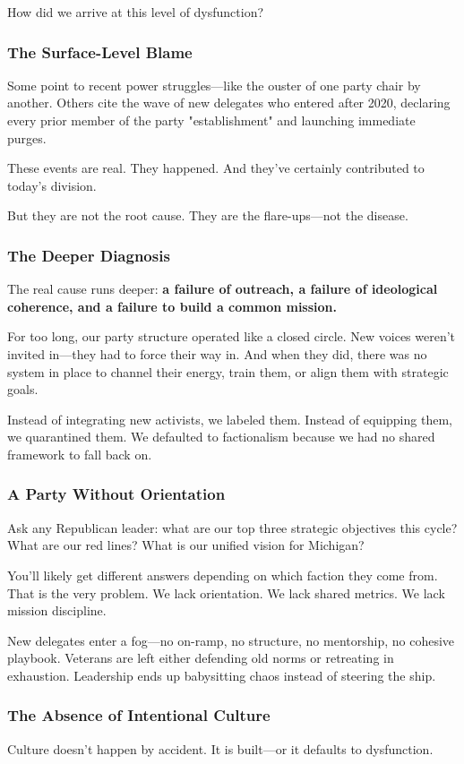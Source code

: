 How did we arrive at this level of dysfunction?

\subsubsection{The Surface-Level Blame}
Some point to recent power struggles—like the ouster of one party chair by another. Others cite the wave of new delegates who entered after 2020, declaring every prior member of the party "establishment" and launching immediate purges.

These events are real. They happened. And they’ve certainly contributed to today’s division.

But they are not the root cause. They are the flare-ups—not the disease.

\subsubsection{The Deeper Diagnosis}
The real cause runs deeper: \textbf{a failure of outreach, a failure of ideological coherence, and a failure to build a common mission.}

For too long, our party structure operated like a closed circle. New voices weren’t invited in—they had to force their way in. And when they did, there was no system in place to channel their energy, train them, or align them with strategic goals.

Instead of integrating new activists, we labeled them. Instead of equipping them, we quarantined them. We defaulted to factionalism because we had no shared framework to fall back on.

\subsubsection{A Party Without Orientation}
Ask any Republican leader: what are our top three strategic objectives this cycle? What are our red lines? What is our unified vision for Michigan?

You’ll likely get different answers depending on which faction they come from. That is the very problem. We lack orientation. We lack shared metrics. We lack mission discipline.

New delegates enter a fog—no on-ramp, no structure, no mentorship, no cohesive playbook. Veterans are left either defending old norms or retreating in exhaustion. Leadership ends up babysitting chaos instead of steering the ship.

\subsubsection{The Absence of Intentional Culture}
Culture doesn’t happen by accident. It is built—or it defaults to dysfunction.

